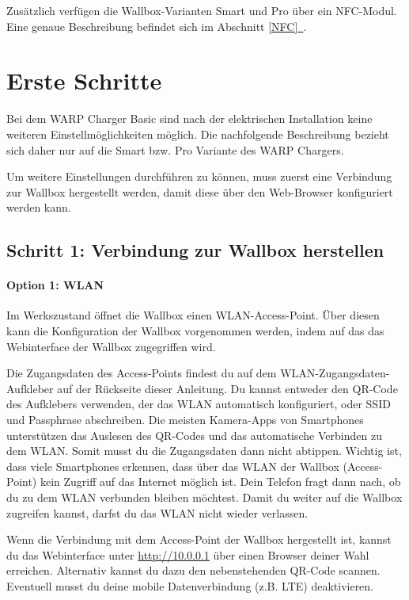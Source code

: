 \documentclass[a4paper,10pt]{article}
\newcommand*{\fullref}[1]{Abschnitt \hyperref[{#1}]{\ref*{#1}~\nameref*{#1}}}
\begin{document}
\begin{multicols*}{2}
    Zusätzlich verfügen die Wallbox-Varianten Smart und Pro über ein NFC-Modul. Eine
    genaue Beschreibung befindet sich im \fullref{NFC}.

    \newpage
    \section{Erste Schritte}\label{setup}

    Bei dem WARP Charger Basic sind nach der elektrischen Installation
    keine weiteren Einstellmöglichkeiten möglich. Die nachfolgende
    Beschreibung bezieht sich daher nur auf die Smart bzw. Pro Variante des WARP
    Chargers.

    Um weitere Einstellungen durchführen zu können, muss zuerst eine Verbindung
    zur Wallbox hergestellt werden, damit diese über den Web-Browser
    konfiguriert werden kann.

    \subsection{Schritt 1: Verbindung zur Wallbox herstellen}

    \paragraph{Option 1: WLAN}
    Im Werkszustand öffnet die Wallbox einen WLAN-Access-Point. Über diesen kann
    die Konfiguration der Wallbox vorgenommen werden, indem auf das
    das Webinterface der Wallbox zugegriffen wird.

    Die Zugangsdaten des Access-Points findest du auf dem WLAN-Zugangsdaten-Aufkleber
    auf der Rückseite dieser Anleitung. Du kannst entweder den QR-Code des Aufklebers verwenden,
    der das WLAN automatisch konfiguriert, oder SSID und Passphrase abschreiben.
    Die meisten Kamera-Apps von Smartphones unterstützen das Auslesen des
    QR-Codes und das automatische Verbinden zu dem WLAN. Somit musst du die
    Zugangsdaten dann nicht abtippen. Wichtig ist, dass viele Smartphones
    erkennen, dass über das WLAN der Wallbox (Access-Point) kein Zugriff auf das
    Internet möglich ist. Dein Telefon fragt dann nach, ob du zu dem WLAN
    verbunden bleiben möchtest. Damit du weiter auf die Wallbox zugreifen
    kannst, darfst du das WLAN nicht wieder verlassen.

    \begin{minipage}{0.35\textwidth}
        Wenn die Verbindung mit dem Access-Point der Wallbox hergestellt ist, kannst du das Webinterface
        unter \url{http://10.0.0.1} über einen Browser deiner Wahl erreichen.
        Alternativ kannst du dazu den nebenstehenden QR-Code scannen.
        Eventuell musst du deine mobile Datenverbindung (z.B. LTE) deaktivieren.
    \end{minipage}\hfill
    \begin{minipage}{0.12\textwidth}
        \begin{flushright}
        \end{flushright}
    \end{minipage}


\end{multicols*}
\end{document}
